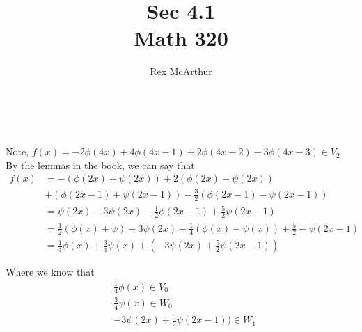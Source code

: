 \documentclass[letterpaper,12pt]{article}
\title{Sec 4.1 \\Math 320}
\author{Rex McArthur}
\theoremstyle{definition}
\begin{document}
\maketitle
{}\\

\\
Note, $f(x) = -2 \phi (4x) + 4 \phi(4x-1) + 2 \phi(4x-2) - 3 \phi(4x-3) \in V_2$\\ 
By the lemmas in the book, we can say that 
\begin{align*}
    f(x) & = -(\phi(2x) + \psi(2x)) + 2(\phi(2x) - \psi(2x)) \\
    &+ (\phi(2x-1) + \psi(2x-1) ) - \frac{3}{2}(\phi(2x-1) - \psi(2x-1) ) \\
    & = \psi(2x) - 3 \psi(2x) - \frac{1}{2} \phi(2x-1) + \frac{5}{2} \psi(2x-1) \\
    & = \frac{1}{2} (\phi(x) + \psi) - 3 \psi(2x) - \frac{1}{4}(\phi(x) - \psi(x) ) + \frac{5}{2}-\psi(2x-1) \\
    & = \frac{1}{4}\phi(x) + \frac{3}{4}\psi(x) + (-3\psi(2x)+ \frac{5}{2} \psi(2x-1) )
\end{align*}

Where we know that 
\begin{align*}
    &\frac{1}{4} \phi(x) \in V_0\\
    &\frac{3}{4}\psi(x) \in W_0\\
    &-3\psi(2x) + \frac{5}{2} \psi (2x-1) ) \in W_1
\end{align*}
    

\\

\\
\end{document}
